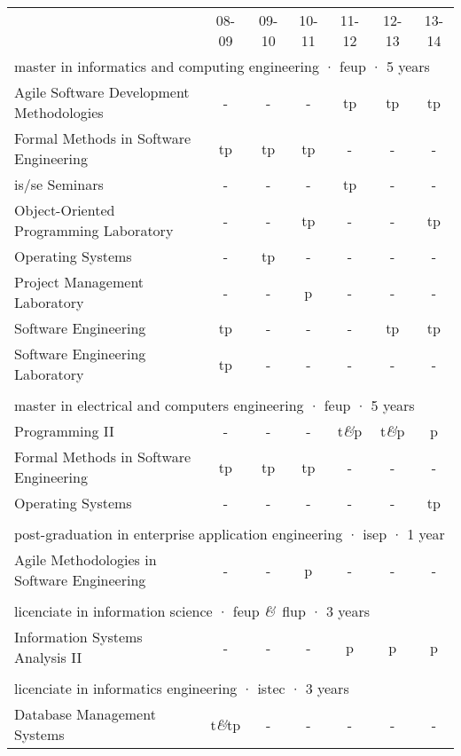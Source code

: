 \documentclass[9pt, a4paper]{article}
\newcommand{\amper}{{\fontspec[Scale=.95]{Hoefler Text}\selectfont\itshape\&}}
\newcommand{\tp}{{\sc tp}}
\begin{document}
\hspace{-1.9mm}\begin{tabular}{ p{6.3cm} c c c c c c }
  & 08-09 & 09-10 & 10-11 & 11-12 & 12-13 & 13-14 \vspace{1mm}\\
  \multicolumn{7}{l}{\color{feup}\sc master in informatics and computing engineering · feup · 5 years\vspace{0.2cm}} \\ 
  Agile Software Development Methodologies & - & - & - & \tp & \tp & \tp \\
  Formal Methods in Software Engineering   & \tp & \tp & \tp  &  - & - & - \\
  {\sc is/se} Seminars 					   & - & - &  - & \tp &  -   &  -   \\
  Object-Oriented Programming Laboratory   &    - &   -  & \tp     &   -  &   -  & \tp \\
  Operating Systems 					   & -    & \tp &     -    &    - &  -   &  -   \\
  Project Management Laboratory 		   &  -   &  -   & {\sc p} & -    &  -   &   -  \\
  Software Engineering 					   & \tp &   -  &   -      &  -   & \tp & \tp \\
  Software Engineering Laboratory 		   & \tp &    - &   -      &   -  &  -   & -    \\
  \\
  \multicolumn{7}{l}{\color{feup}\sc master in electrical and computers engineering · feup · 5 years\vspace{0.2cm}} \\
  Programming II 						   &  -   &  -   &     -    & {\sc t\amper p} & {\sc t\amper p} & {\sc p} \\
  Formal Methods in Software Engineering   & \tp & \tp & \tp     &   -  &   -  &   -  \\
  Operating Systems 					   &  -   &  -   &   -      &  -   &   -  & \tp \\
  \\
  \multicolumn{7}{l}{\color{feup}\sc post-graduation in enterprise application engineering · isep · 1 year\vspace{0.2cm}} \\
  Agile Methodologies in Software Engineering & - & - & {\sc p} & - & - & - \\
  \\
  \multicolumn{7}{l}{\color{feup}\sc licenciate in information science · feup \amper~flup · 3 years\vspace{0.2cm}} \\
  Information Systems Analysis II & - & - & - & {\sc p} & {\sc p} & {\sc p} \\
  \\
  \multicolumn{7}{l}{\color{feup}\sc licenciate in informatics engineering · istec · 3 years\vspace{0.2cm}}\\
  Database Management Systems & {\sc t\amper tp} & - & - & - & - & - \\
\end{tabular}
\end{document}

